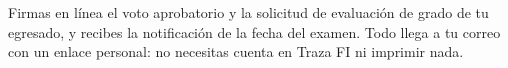 \documentclass[11pt,a4paper]{article}
\begin{document}
{\small\tableofcontents}
\newpage
\begin{quevasahacer}
Firmas en línea el voto aprobatorio y la solicitud de evaluación de grado de tu egresado, y recibes la notificación de la fecha del examen. Todo llega a tu correo con un enlace personal: no necesitas cuenta en Traza FI ni imprimir nada.
\end{quevasahacer}



\end{document}
